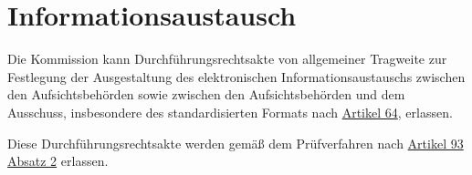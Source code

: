 \chapter{Informationsaustausch}
\label{ch:67}


Die Kommission kann Durchführungsrechtsakte von allgemeiner Tragweite zur Festlegung der Ausgestaltung des
elektronischen Informationsaustauschs zwischen den Aufsichtsbehörden sowie zwischen den Aufsichtsbehörden und dem
Ausschuss, insbesondere des standardisierten Formats nach \hyperref[ch:64]{Artikel 64}, erlassen.

Diese Durchführungsrechtsakte werden gemäß dem Prüfverfahren nach \hyperref[itm:93-2]{Artikel 93 Absatz 2} erlassen.  


